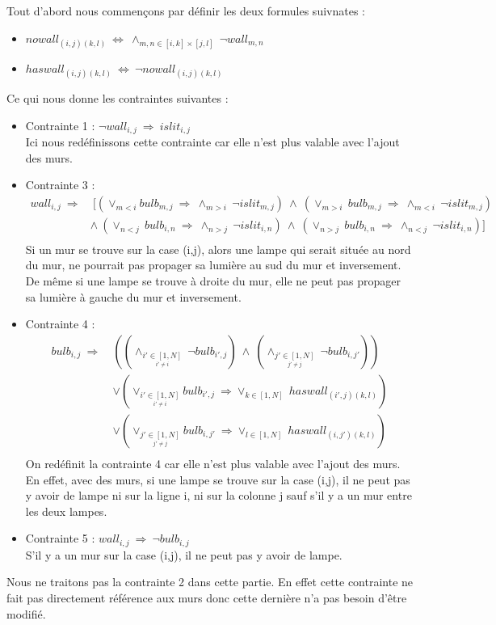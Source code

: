 \documentclass{article}
\begin{document}
Tout d'abord nous commençons par d\'efinir les deux formules suivnates :
\begin{itemize}
\item $ nowall_{(i,j)(k,l)} ~ \Leftrightarrow ~ \wedge_{m,n \in [i,k]\times[j,l]} ~ \neg wall_{m,n} $
\item $ haswall_{(i,j)(k,l)} ~ \Leftrightarrow ~ \neg nowall_{(i,j)(k,l)} $\\
\end{itemize}
Ce qui nous donne les contraintes suivantes :
\begin{itemize}
  
\item Contrainte 1 : $ \neg wall_{i,j} ~ \Rightarrow ~ islit_{i,j} $ \\
  Ici nous redéfinissons cette contrainte car elle n'est plus valable avec l'ajout des murs. 
\item Contrainte 3 :
\begin{align}
\nonumber
 wall_{i,j} ~ \Rightarrow &~ [(\vee_{m<i}bulb_{m,j} ~ \Rightarrow ~ \wedge_{m>i} ~ \neg islit_{m,j})~\wedge ~ (\vee_{m>i} ~ bulb_{m,j} ~ \Rightarrow ~ \wedge_{m<i} ~ \neg islit_{m,j})\\
\nonumber
& \wedge ~ (\vee_{n<j} ~ bulb_{i,n} ~ \Rightarrow ~ \wedge_{n>j} ~ \neg islit_{i,n})~ \wedge ~ (\vee_{n>j} ~ bulb_{i,n} ~ \Rightarrow ~ \wedge_{n<j} ~ \neg islit_{i,n})]\\
\nonumber
\end{align}
Si un mur se trouve sur la case (i,j), alors une lampe qui serait située au nord du mur, ne pourrait pas propager sa lumière au sud du mur et inversement. De même si une lampe se trouve à droite du mur, elle ne peut pas propager sa lumière à gauche du mur et inversement.

\item Contrainte 4 :
  \begin{eqnarray*}
    \nonumber bulb_{i,j} ~ \Rightarrow ~& ((\wedge_{\underset{i'\neq i}{i' \in [1,N]}} ~ \neg bulb_{i',j}) ~ \wedge ~ (\wedge_{\underset{j'\neq j}{j' \in [1,N]}} ~ \neg bulb_{i,j'}))\nonumber \\
    & \vee (\vee_{\underset{i'\neq i}{i' \in [1,N]}}bulb_{i',j} ~ \Rightarrow \vee_{k \in [1,N]} ~ haswall_{(i',j)(k,l)}) \nonumber \\
    &\vee (\vee_{\underset{j'\neq j}{j' \in [1,N]}}bulb_{i,j'} ~ \Rightarrow \vee_{l \in [1,N]} ~ haswall_{(i,j')(k,l)}) \nonumber \\
\end{eqnarray*}
  On redéfinit la contrainte 4 car elle n'est plus valable avec l'ajout des murs. En effet, avec des murs, si une lampe se trouve sur la case (i,j), il ne peut pas y avoir de lampe ni sur la ligne i, ni sur la colonne j sauf s'il y a un mur entre les deux lampes.

\item Contrainte 5 : $ wall_{i,j} ~ \Rightarrow ~ \neg bulb_{i,j} $\\
S'il y a un mur sur la case (i,j), il ne peut pas y avoir de lampe.
\end{itemize}
Nous ne traitons pas la contrainte 2 dans cette partie. En effet cette contrainte ne fait pas directement réf\'erence aux murs donc cette dernière n'a pas besoin d'être modifié. 
\end{document}
